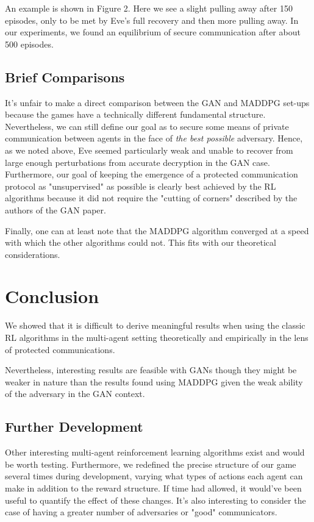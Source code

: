 \documentclass{llncs}
\begin{document}
An example is shown in Figure 2. Here we see a slight pulling away after 150 episodes, only to be met by Eve's full recovery and then more pulling away. In our experiments, we found an equilibrium of secure communication after about 500 episodes. 

\subsection{Brief Comparisons}

It's unfair to make a direct comparison between the GAN and MADDPG set-ups because the games have a technically different fundamental structure. Nevertheless, we can still define our goal as to secure some means of private communication between agents in the face of \textit{the best possible} adversary. Hence, as we noted above, Eve seemed particularly weak and unable to recover from large enough perturbations from accurate decryption in the GAN case. Furthermore, our goal of keeping the emergence of a protected communication protocol as "unsupervised" as possible is clearly best achieved by the RL algorithms because it did not require the "cutting of corners" described by the authors of the GAN paper. 

Finally, one can at least note that the MADDPG algorithm converged at a speed with which the other algorithms could not. This fits with our theoretical considerations. 

\section{Conclusion}

We showed that it is difficult to derive meaningful results when using the classic RL algorithms in the multi-agent setting theoretically and empirically in the lens of protected communications. 

Nevertheless, interesting results are feasible with GANs though they might be weaker in nature than the results found using MADDPG given the weak ability of the adversary in the GAN context. 
\subsection{Further Development}

Other interesting multi-agent reinforcement learning algorithms exist and would be worth testing\cite{gupta2017cooperative}. Furthermore, we redefined the precise structure of our game several times during development, varying what types of actions each agent can make in addition to the reward structure. If time had allowed, it would've been useful to quantify the effect of these changes. It's also interesting to consider the case of having a greater number of adversaries or "good" communicators. 
\end{document}
